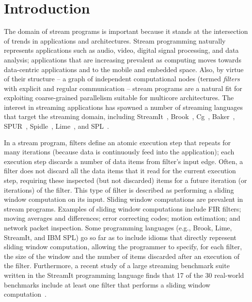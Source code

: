 \section{Introduction}

The domain of stream programs is important because it stands at the
intersection of trends in applications and architectures.  Stream
programming naturally represents applications such as audio, video,
digital signal processing, and data analysis; applications that are
increasing prevalent as computing moves towards data-centric
applications and to the mobile and embedded space.  Also, by virtue of
their structure -- a graph of independent computational nodes (termed
{\it filters} with explicit and regular communication -- stream
programs are a natural fit for exploiting coarse-grained parallelism
suitable for multicore architectures.  The interest in streaming
applications has spawned a number of streaming languages that target
the streaming domain, including StreamIt~\cite{streamitcc},
Brook~\cite{brook04}, Cg~\cite{cg03}, Baker~\cite{Baker},
SPUR~\cite{spur05samos}, Spidle~\cite{spidle03}, Lime~\cite{lime10},
and SPL~\cite{spl09}.

In a stream program, filters define an atomic execution step that
repeats for many iterations (because data is continuously feed into
the application); each execution step discards a number of data items
from filter's input edge.  Often, a filter does not discard all the
data items that it read for the current execution step, requiring
these inspected (but not discarded) items for a future iteration (or
iterations) of the filter.  This type of filter is described as
performing a sliding window computation on its input. Sliding window
computations are prevalent in stream programs.  Examples of sliding
window computations include FIR filters; moving averages and
differences; error correcting codes; motion estimation; and network
packet inspection.  Some programming languages (e.g., Brook, Lime,
StreamIt, and IBM SPL) go so far as to include idioms that directly
represent sliding window computation, allowing the programmer to
specify, for each filter, the size of the window and the number of
items discarded after an execution of the filter.  Furthermore, a
recent study of a large streaming benchmark suite written in the
StreamIt programming language finds that 17 of the 30 real-world
benchmarks include at least one filter that performs a sliding window
computation~\cite{streamit-suite}.

